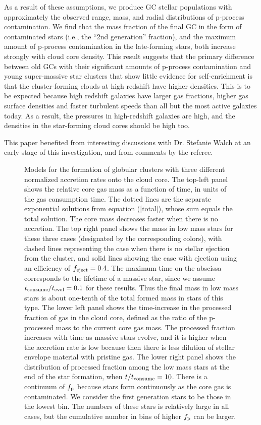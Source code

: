 \documentclass[12pt,preprint]{aastex}
\begin{document}
As a result of these assumptions, we produce GC stellar populations with
approximately the observed range, mass, and radial distributions of p-process
contamination.  We find that the mass fraction of the final GC in the form of
contaminated stars (i.e., the ``2nd generation'' fraction), and the maximum amount
of p-process contamination in the late-forming stars, both increase strongly with
cloud core density.  This result suggests that the primary difference between old
GCs with their significant amounts of p-process contamination and young
super-massive star clusters that show little evidence for self-enrichment is that
the cluster-forming clouds at high redshift have higher densities.  This is to be
expected because high redshift galaxies have larger gas fractions, higher gas
surface densities and faster turbulent speeds than all but the most active galaxies
today. As a result, the pressures in high-redshift galaxies are high, and the
densities in the star-forming cloud cores should be high too.


This paper benefited from interesting discussions with Dr. Stefanie Walch at an
early stage of this investigation, and from comments by the referee.





\clearpage
\begin{figure}
\caption{Models for the formation of globular clusters with three different normalized
accretion rates onto the cloud core. The top-left panel shows the relative core gas mass
as a function of time, in units of the gas consumption time. The dotted lines are the
separate exponential solutions from equation (\ref{total}), whose sum equals the total
solution. The core mass decreases faster when there is no accretion. The top right panel
shows the mass in low mass stars for these three cases (designated by the corresponding
colors), with dashed lines representing the case when there is no stellar ejection from
the cluster, and solid lines showing the case with ejection using an efficiency of
$f_{\rm eject}=0.4$. The maximum time on the abscissa corresponds to the lifetime of a
massive star, since we assume $t_{\rm consume}/t_{\rm evol}=0.1$ for these results.
Thus the final mass in low mass stars is about one-tenth of the total formed mass in stars of
this type.  The lower left panel shows the time-increase in the processed fraction of gas
in the cloud core, defined as the ratio of the p-processed mass to the current core gas mass.
The processed fraction increases with time as massive stars evolve, and it is higher when the
accretion rate is low because then there is less dilution of stellar envelope material with
pristine gas. The lower right panel shows the distribution of processed fraction among
the low mass stars at the end of the star formation, when $t/t_{\rm consume}=10$.  There is
a continuum of $f_{\rm p}$ because stars form continuously as the core gas is contaminated.
We consider the first generation stars to be those in the lowest bin.  The numbers of these
stars is relatively large in all cases, but the cumulative number in bins of higher $f_{\rm p}$ can be
larger.} \label{walch16sfr2gasmass}\end{figure}
\end{document}
